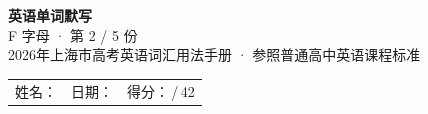 \documentclass[10pt,a4paper]{article}
\begin{document}
\pagestyle{plain}

\begin{center}
{\LARGE\bfseries 英语单词默写}\\[0.22em]
{\large F 字母 · 第 2 / 5 份}\\[0.18em]
{\small 2026年上海市高考英语词汇用法手册 · 参照普通高中英语课程标准}
\end{center}

\vspace{0.25em}
\noindent\begin{tabular}{@{}p{}@{}p{}@{}p{}@{}}
姓名：\underline{\hspace{2.0cm}} & 日期：\underline{\hspace{2.0cm}} & 得分：\underline{\hspace{1.3cm}}\,/\,42 \\
\end{tabular}

\vspace{0.3em}

\vspace{0.08em}
\end{document}
